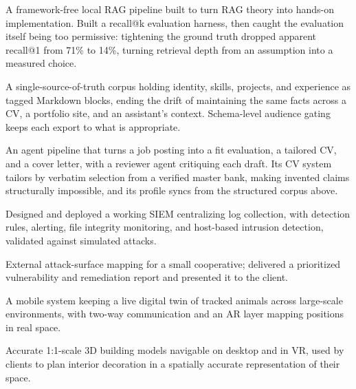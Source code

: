 \documentclass[10pt,a4paper]{article}
\newcommand{\cvproject}[3]{\needspace{4\baselineskip}\vspace{2pt}{\bfseries #1}\par\vspace{-4pt}{\itshape\small Tech stack: #2\par}\vspace{-4pt}#3\par}
\begin{document}
\cvproject{From-Scratch Local RAG Pipeline}{Python · Ollama · nomic-embed-text · numpy}{A framework-free local RAG pipeline built to turn RAG theory into hands-on implementation. Built a recall@k evaluation harness, then caught the evaluation itself being too permissive: tightening the ground truth dropped apparent recall@1 from 71\% to 14\%, turning retrieval depth from an assumption into a measured choice.}

\cvproject{Structured Personal Knowledge Corpus}{Python · YAML · Markdown}{A single-source-of-truth corpus holding identity, skills, projects, and experience as tagged Markdown blocks, ending the drift of maintaining the same facts across a CV, a portfolio site, and an assistant's context. Schema-level audience gating keeps each export to what is appropriate.}

\cvproject{Agent-Driven Application Pipeline}{Python · LaTeX · TypeScript · Bun · Claude Code · Git}{An agent pipeline that turns a job posting into a fit evaluation, a tailored CV, and a cover letter, with a reviewer agent critiquing each draft. Its CV system tailors by verbatim selection from a verified master bank, making invented claims structurally impossible, and its profile syncs from the structured corpus above.}

\cvproject{SIEM Implementation: Security Monitoring \& Detection}{Wazuh · Elasticsearch · Kibana · HIDS · FIM}{Designed and deployed a working SIEM centralizing log collection, with detection rules, alerting, file integrity monitoring, and host-based intrusion detection, validated against simulated attacks.}

\cvproject{Cybersecurity Assessment \& Footprinting (Client Project)}{OSINT · Offensive security · Vulnerability assessment}{External attack-surface mapping for a small cooperative; delivered a prioritized vulnerability and remediation report and presented it to the client.}

\cvproject{Digital Twin \& Animal Tracking App}{Kotlin · React Native · Firebase · A-Frame}{A mobile system keeping a live digital twin of tracked animals across large-scale environments, with two-way communication and an AR layer mapping positions in real space.}

\cvproject{1:1 Architectural VR Walkthrough (Client Project)}{Unity · 3D modelling · Desktop + headset}{Accurate 1:1-scale 3D building models navigable on desktop and in VR, used by clients to plan interior decoration in a spatially accurate representation of their space.}
\end{document}
